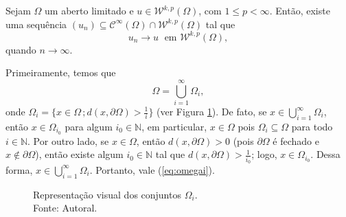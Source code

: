\documentclass[a4paper, 11pt]{book}
\theoremstyle{definition}
\newcommand{\bN}{\mathbb{N}}
\newcommand{\cC}{\mathcal{C}}
\newcommand{\cW}{\mathcal{W}}
\begin{document}
\begin{tbox} \label{thm:aprox-2}
    Sejam $\Omega$ um aberto limitado e $u \in \cW^{k,p}(\Omega)$, com $1 \leqslant p < \infty$.
    Então, existe uma sequência $(u_n) \subseteq \cC^{\infty}(\Omega) \cap \cW^{k,p}(\Omega)$ tal que
    \[
        u_n \to u \;\text{ em } \cW^{k,p}(\Omega),
    \] 
    quando $n \to \infty$.
\end{tbox}
\begin{prf}
    Primeiramente, temos que
    \begin{equation} \label{eq:omegai}
        \Omega = \bigcup_{i=1}^\infty \Omega_i,
    \end{equation}
    onde $\Omega_i = \{x \in \Omega \,; d(x, \partial\Omega) > \tfrac{1}{i}\}$ (ver Figura \ref{fig:omegai}). De fato,
    se $x \in \bigcup_{i=1}^\infty \Omega_i$, então $x \in \Omega_{i_0}$ para algum $i_0 \in \bN$, em particular, $x \in \Omega$ pois $\Omega_i \subseteq \Omega$ para todo $i \in \bN$.
    Por outro lado, se $x \in \Omega$, então $d(x,\partial \Omega) > 0$ (pois $\partial\Omega$ é fechado e $x \not\in \partial\Omega$), então existe algum $i_0 \in \bN$ tal que $d(x, \partial \Omega) > \frac{1}{i_0}$; logo, $x \in \Omega_{i_0}$. Dessa forma, $x \in \bigcup_{i=1}^\infty \Omega_i$.
    Portanto, vale (\ref{eq:omegai}). 
    \begin{figure}
        \centering
        
        \caption{Representação visual dos conjuntos $\Omega_i$.\\Fonte: Autoral.}
        \label{fig:omegai}
    \end{figure}
    

\end{prf}
\end{document}
